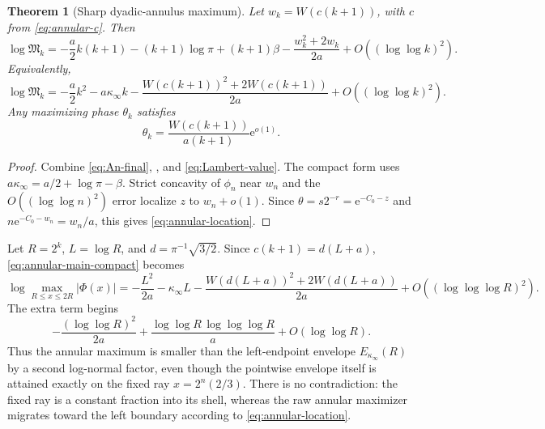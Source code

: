 \documentclass[11pt,oneside]{article}
\newtheorem{theorem}{Theorem}[section]
\theoremstyle{definition}
\theoremstyle{remark}
\newcommand{\e}{\mathrm e}
\newcommand{\Phiup}{\Phi}
\begin{document}
\begin{theorem}[Sharp dyadic-annulus maximum]
\label{thm:annular-main}
Let $w_k=W(c(k+1))$, with $c$ from \eqref{eq:annular-c}.  Then
\begin{equation}
 \boxed{\displaystyle
 \log\mathfrak M_k
 =-\frac a2k(k+1)-(k+1)\log\pi+(k+1)\beta
 -\frac{w_k^2+2w_k}{2a}
 +O((\log\log k)^2).}
 \label{eq:annular-main}
\end{equation}
Equivalently,
\begin{equation}
 \log\mathfrak M_k
 =-\frac a2k^2-a\kappa_\infty k
 -\frac{W(c(k+1))^2+2W(c(k+1))}{2a}
 +O((\log\log k)^2).
 \label{eq:annular-main-compact}
\end{equation}
Any maximizing phase $\theta_k$ satisfies
\begin{equation}
 \theta_k=\frac{W(c(k+1))}{a(k+1)}\e^{o(1)}.
 \label{eq:annular-location}
\end{equation}
\end{theorem}

\begin{proof}
Combine \eqref{eq:An-final}, , and
\eqref{eq:Lambert-value}.  The compact form uses
$a\kappa_\infty=a/2+\log\pi-\beta$.  Strict concavity of $\phi_n$ near $w_n$ and the
$O((\log\log n)^2)$ error localize $z$ to $w_n+o(1)$.  Since
$\theta=s2^{-r}=\e^{-C_0-z}$ and
$n\e^{-C_0-w_n}=w_n/a$, this gives \eqref{eq:annular-location}.
\end{proof}

Let $R=2^k$, $L=\log R$, and $d=\pi^{-1}\sqrt{3/2}$.  Since
$c(k+1)=d(L+a)$, \eqref{eq:annular-main-compact} becomes
\begin{equation}
 \log\max_{R\le x\le2R}|\Phiup(x)|
 =-\frac{L^2}{2a}-\kappa_\infty L
 -\frac{W(d(L+a))^2+2W(d(L+a))}{2a}
 +O((\log\log\log R)^2).
 \label{eq:annular-physical}
\end{equation}
The extra term begins
\begin{equation}
 -\frac{(\log\log R)^2}{2a}
 +\frac{\log\log R\,\log\log\log R}{a}
 +O(\log\log R).
 \label{eq:second-lognormal}
\end{equation}
Thus the annular maximum is smaller than the left-endpoint envelope
$E_{\kappa_\infty}(R)$ by a second log-normal factor, even though the pointwise envelope
itself is attained exactly on the fixed ray $x=2^n(2/3)$.  There is no contradiction: the
fixed ray is a constant fraction into its shell, whereas the raw annular maximizer migrates
toward the left boundary according to \eqref{eq:annular-location}.
\end{document}
